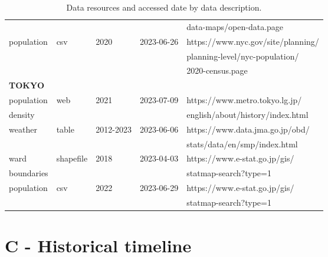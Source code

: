 \begin{table}[htbp]
\begin{adjustwidth}{-1in}{-1in}
\begin{tabular}{lllll}
{} & {} & {} & {} & data-maps/open-data.page \\
population &        csv &             2020 &    2023-06-26 &  https://www.nyc.gov/site/planning/ \\
{} & {} & {} & {} & planning-level/nyc-population/ \\
{} & {} & {} & {} & 2020-census.page \\
\midrule
\textbf{TOKYO} & {} & {} & {} & {}\\
population &        web &             2021 &    2023-07-09 &  https://www.metro.tokyo.lg.jp/ \\
density & {} & {} & {} & english/about/history/index.html \\
weather &      table &        2012-2023 &    2023-06-06 &  https://www.data.jma.go.jp/obd/ \\
{} & {} & {} & {} & stats/data/en/smp/index.html \\
ward &  shapefile &             2018 &    2023-04-03 &  https://www.e-stat.go.jp/gis/ \\
boundaries & {} & {} & {} & statmap-search?type=1 \\
population &        csv &             2022 &    2023-06-29 &  https://www.e-stat.go.jp/gis/ \\
{} & {} & {} & {} & statmap-search?type=1 \\
\bottomrule
\end{tabular}
\caption[Data resources]{Data resources and accessed date by data description.}
\label{table:data_resources}
\end{adjustwidth}
\end{table}


\chapter*{C - Historical timeline}

\renewcommand{\thefigure}{C.\arabic{figure}}
\setcounter{figure}{0}
\renewcommand{\thetable}{C.\arabic{table}}
\setcounter{table}{0}



